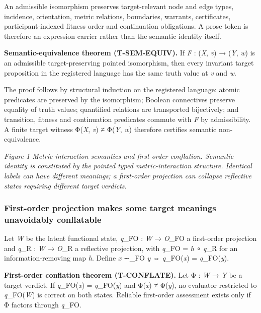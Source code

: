 An admissible isomorphism preserves target-relevant node and edge types,
incidence, orientation, metric relations, boundaries, warrants,
certificates, participant-indexed fitness order and continuation
obligations. A prose token is therefore an expression carrier rather
than the semantic identity itself.

\textbf{Semantic-equivalence theorem (T-SEM-EQUIV).} If \emph{F} :
(\emph{X}, \emph{v}) → (\emph{Y}, \emph{w}) is an admissible
target-preserving pointed isomorphism, then every invariant target
proposition in the registered language has the same truth value at
\emph{v} and \emph{w}.

The proof follows by structural induction on the registered language:
atomic predicates are preserved by the isomorphism; Boolean connectives
preserve equality of truth values; quantified relations are transported
bijectively; and transition, fitness and continuation predicates commute
with \emph{F} by admissibility. A finite target witness Φ(\emph{X},
\emph{v}) ≠ Φ(\emph{Y}, \emph{w}) therefore certifies semantic
non-equivalence.

\emph{Figure 1 \textbar{} Metric-interaction semantics and first-order
conflation. Semantic identity is constituted by the pointed typed
metric-interaction structure. Identical labels can have different
meanings; a first-order projection can collapse reflective states
requiring different target verdicts.}

\hypertarget{first-order-projection-makes-some-target-meanings-unavoidably-conflatable}{%
\subsubsection{First-order projection makes some target meanings
unavoidably
conflatable}\label{first-order-projection-makes-some-target-meanings-unavoidably-conflatable}}

Let \emph{W} be the latent functional state, \emph{q}\_FO : \emph{W} →
\emph{O}\_FO a first-order projection and \emph{q}\_R : \emph{W} →
\emph{O}\_R a reflective projection, with \emph{q}\_FO = \emph{h} ∘
\emph{q}\_R for an information-removing map \emph{h}. Define \emph{x}
∼\_FO \emph{y} ⇔ \emph{q}\_FO(\emph{x}) = \emph{q}\_FO(\emph{y}).

\textbf{First-order conflation theorem (T-CONFLATE).} Let Φ : \emph{W} →
\emph{Y} be a target verdict. If \emph{q}\_FO(\emph{x}) =
\emph{q}\_FO(\emph{y}) and Φ(\emph{x}) ≠ Φ(\emph{y}), no evaluator
restricted to \emph{q}\_FO(\emph{W}) is correct on both states. Reliable
first-order assessment exists only if Φ factors through \emph{q}\_FO.

